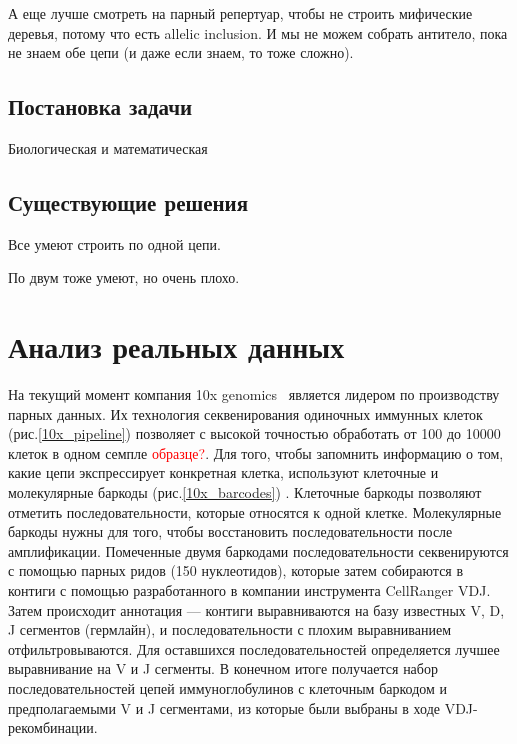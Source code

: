 \documentclass{spbau-diploma}
\newcommand{\todo}{\textcolor{red}}
\begin{document}
А еще лучше смотреть на парный репертуар, чтобы не строить мифические деревья, потому что есть allelic inclusion.
И мы не можем собрать антитело, пока не знаем обе цепи (и даже если знаем, то тоже сложно).



\subsection{Постановка задачи}

Биологическая и математическая




\subsection{Существующие решения}

Все умеют строить по одной цепи.


По двум тоже умеют, но очень плохо.


\section{Анализ реальных данных}

На текущий момент компания 10x genomics~\cite{pmid28091601} является лидером по производству парных данных.
Их технология секвенирования одиночных иммунных клеток (рис.\ref{10x_pipeline}) позволяет с высокой точностью обработать от 100 до 10000 клеток в одном семпле \todo{образце?}.
Для того, чтобы запомнить информацию о том, какие цепи экспрессирует конкретная клетка, используют клеточные и молекулярные баркоды (рис.\ref{10x_barcodes}) .
Клеточные баркоды позволяют отметить последовательности, которые относятся к одной клетке.
 Молекулярные баркоды нужны для того, чтобы восстановить последовательности после амплификации.
 Помеченные двумя баркодами последовательности секвенируются с помощью парных ридов (150 нуклеотидов), которые затем собираются в контиги с помощью разработанного в компании инструмента CellRanger VDJ.
Затем происходит аннотация --- контиги выравниваются на базу известных V, D, J сегментов (гермлайн), и последовательности с плохим выравниванием отфильтровываются.
Для оставшихся последовательностей определяется лучшее выравнивание на V и J сегменты.
В конечном итоге получается набор последовательностей цепей иммуноглобулинов с клеточным баркодом и предполагаемыми V и J сегментами, из которые были выбраны в ходе VDJ-рекомбинации.
\end{document}
